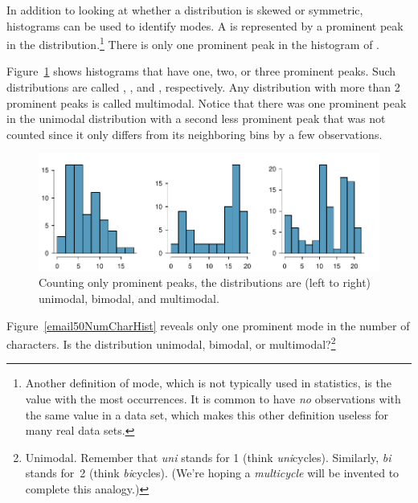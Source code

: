 \begin{doublespace}
In addition to looking at whether a distribution is skewed or symmetric, histograms can be used to identify modes. A  is represented by a prominent peak in the distribution.\footnote{Another definition of mode, which is not typically used in statistics, is the value with the most occurrences. It is common to have \emph{no} observations with the same value in a data set, which makes this other definition useless for many real data sets.} There is only one prominent peak in the histogram of .

Figure~\ref{singleBiMultiModalPlots} shows histograms that have one, two, or three prominent peaks. Such distributions are called , , and , respectively. Any distribution with more than 2 prominent peaks is called multimodal. Notice that there was one prominent peak in the unimodal distribution with a second less prominent peak that was not counted since it only differs from its neighboring bins by a few observations.

\begin{figure}[h]
	\centering
	\includegraphics[width=\textwidth]{ch_intro_to_data_oi_biostat/figures/singleBiMultiModalPlots/singleBiMultiModalPlots}
	\caption{Counting only prominent peaks, the distributions are (left to right) unimodal, bimodal, and multimodal.}
	\label{singleBiMultiModalPlots}
\end{figure}

\begin{exercise}
	Figure~\ref{email50NumCharHist} reveals only one prominent mode in the number of characters. Is the distribution unimodal, bimodal, or multimodal?\footnote{Unimodal. Remember that \emph{uni} stands for 1 (think \emph{uni}cycles). Similarly, \emph{bi} stands for~2 (think \emph{bi}cycles). (We're hoping a \emph{multicycle} will be invented to complete this analogy.)} %
\end{exercise}


\end{doublespace}
